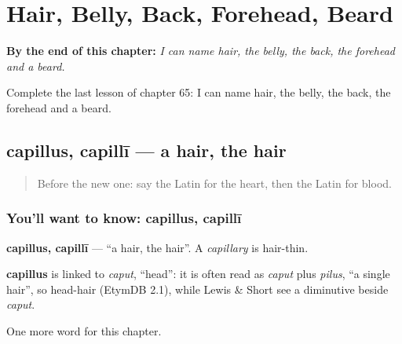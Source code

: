 
\chapter{Hair, Belly, Back, Forehead, Beard}
\label{ch:la-hair-belly-back-forehead-beard}

\begin{chapteropening}
\textbf{By the end of this chapter:} \emph{I can name hair, the belly, the back, the forehead and a beard.}

Complete the last lesson of chapter 65: I can name hair, the belly, the back, the forehead and a beard.
\end{chapteropening}

\section[capillus, capillī]{capillus, capillī — a hair, the hair}

\label{lesson:LA-C65-capillus}



\begin{quote}
Before the new one: say the Latin for the heart, then the Latin for blood.
\end{quote}

\subsection*{You'll want to know: capillus, capillī}
\textbf{capillus, capillī} — \textquotedblleft{}a hair, the hair\textquotedblright{}. A \emph{capillary} is hair-thin.

\begin{cousinweb}
\textbf{capillus} is linked to \emph{caput}, \textquotedblleft{}head\textquotedblright{}: it is often read as \emph{caput} plus \emph{pilus}, \textquotedblleft{}a single hair\textquotedblright{}, so head-hair (EtymDB 2.1), while Lewis \& Short see a diminutive beside \emph{caput}.
\end{cousinweb}

\begin{grammarlens}[title={What you've built}]
One more word for this chapter.
\end{grammarlens}

